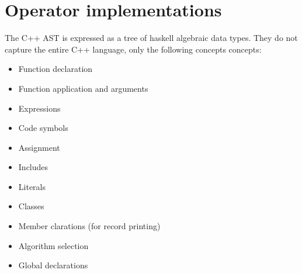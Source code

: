 \begin{comment}
  \begin{code}
\begin{haskellcode}
data SoftUNameCode a = SoftUNameCode {
  uCodeTail :: Maybe (UniqueSymbol,SoftUNameCode a),
  uCodeHead :: a,
  uCodeMaxId :: UId
  }

data UniueSymbol a = UniqueSymbol {
  symbolUId :: UId,
  symbolMkName :: UId -> a
  }
\end{haskellcode}
    \caption{Variable reuse}
  \end{code}

  What this amounts to is a list of code objects interleaved with unique
  symbol names. Each unique symbol name is a combination of an unique id
  and a function that would generate a unique string of code based on
  that id. This unique id must be incrementable.

  When two \hask{SoftUNameCode} objects are concatenated, in the simple case
  we aim for the variable names to be completely disjoint. This is
  achieved by simply incrementing all symbolUIds in the right hand side
  of the concatenation operator by the left hand side uCodeMaxId.

  In the slightly more complex case where we know that the same unique
  symbol is both on the left and the right hand side of the
  concatenation operator we use co-join \hask{SoftUNameCode} a into
  \hask{SoftUNameCode (SoftUNameCode a)} pushing the shared symbol in the
  internal layer. When concatenating SoftUNameCode, only the top layer
  of the right hand side is changed. After concatenation the functor is
  flattened:

  With this method we can flexibly concatenate code keeping certain
  variables hygienic while maintaining reference to others.
\end{comment}

\section{Operator implementations}


The C++ AST is expressed as a tree of haskell algebraic data
types. They do not capture the entire C++ language, only the following
concepts concepts:

\begin{itemize}
\item Function declaration
\item Function application and arguments
\item Expressions
\item Code symbols
\item Assignment
\item Includes
\item Literals
\item Classes
\item Member clarations (for record printing)
\item Algorithm selection
\item Global declarations
\end{itemize}

